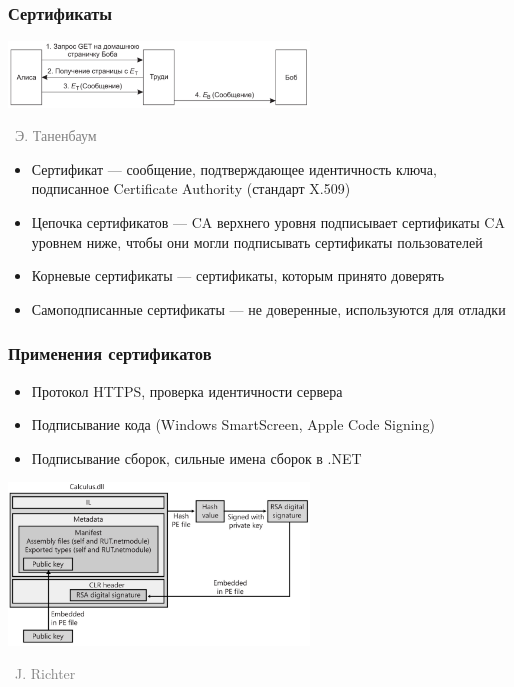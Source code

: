 \documentclass[xetex,mathserif,serif]{beamer}
\newcommand{\attribution}[1] {
\vspace{-5mm}\begin{flushright}\begin{scriptsize}\textcolor{gray}{\textcopyright\, #1}\end{scriptsize}\end{flushright}
}
\begin{document}
	\begin{frame}
		\frametitle{Сертификаты}
		\begin{center}
			\includegraphics[width=0.6\textwidth]{manInTheMiddle.png}
			\attribution{Э. Таненбаум}
		\end{center}
		\begin{itemize}
			\item Сертификат --- сообщение, подтверждающее идентичность ключа, подписанное Certificate Authority (стандарт X.509)
			\item Цепочка сертификатов --- CA верхнего уровня подписывает сертификаты CA уровнем ниже, чтобы они могли подписывать сертификаты пользователей
			\item Корневые сертификаты --- сертификаты, которым принято доверять
			\item Самоподписанные сертификаты --- не доверенные, используются для отладки
		\end{itemize}
	\end{frame}

	\begin{frame}
		\frametitle{Применения сертификатов}
		\begin{itemize}
			\item Протокол HTTPS, проверка идентичности сервера
			\item Подписывание кода (Windows SmartScreen, Apple Code Signing)
			\item Подписывание сборок, сильные имена сборок в .NET
		\end{itemize}
		\begin{center}
			\includegraphics[width=0.6\textwidth]{dotNetCodeSigning.png}
			\attribution{J. Richter}
		\end{center}
	\end{frame}
\end{document}

